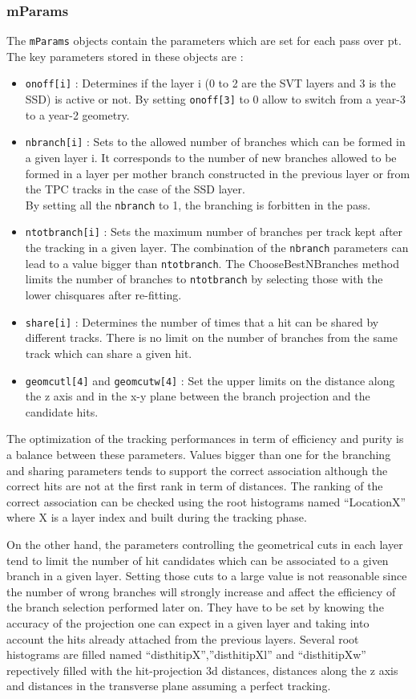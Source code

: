 \documentclass[twoside]{article}
\begin{document}
\subsubsection{mParams}
\label{sec:mParamsq}
The \verb+mParams+ objects contain the parameters which are set for
each pass over pt. The key parameters stored in these objects are :
\begin{itemize}
\item \verb+onoff[i]+ : Determines if the layer i (0 to 2 are the SVT 
layers and 3 is the SSD) is active or not. By setting \verb+onoff[3]+
to 0 allow to switch from a year-3 to a year-2 geometry.
\item \verb+nbranch[i]+ : Sets to the allowed number of branches which can 
be formed in a given layer i. It corresponds to the number of new
branches allowed to be formed in a layer per mother branch
constructed in the previous layer or from the TPC tracks in the case
of the SSD layer.\\ By setting all the \verb+nbranch+ to 1, the
branching is forbitten in the pass.
\item \verb+ntotbranch[i]+ : Sets the maximum number of branches 
per track kept after the tracking in a given layer. The combination of
the \verb+nbranch+ parameters can lead to a value bigger than
\verb+ntotbranch+. The ChooseBestNBranches method limits the number of
branches to \verb+ntotbranch+ by selecting those with the lower
chisquares after re-fitting.
\item \verb+share[i]+ : Determines the number of times that a hit can 
be shared by different tracks. There is no limit on the number of
branches from the same track which can share a given hit.
\item \verb+geomcutl[4]+ and \verb+geomcutw[4]+ : Set the upper limits 
on the distance along the z axis and in the x-y plane between the
branch projection and the candidate hits.
\end{itemize}

The optimization of the tracking performances in term of efficiency
and purity is a balance between these parameters. Values bigger than
one for the branching and sharing parameters tends to support the
correct association although the correct hits are not at the first
rank in term of distances. The ranking of the correct association can
be checked using the root histograms named ``LocationX'' where X is a
layer index and built during the tracking phase.

On the other hand, the parameters controlling the geometrical cuts in
each layer tend to limit the number of hit candidates which can be
associated to a given branch in a given layer. Setting those cuts to a
large value is not reasonable since the number of wrong branches will
strongly increase and affect the efficiency of the branch selection
performed later on. They have to be set by knowing the accuracy of the
projection one can expect in a given layer and taking into account the
hits already attached from the previous layers. Several root
histograms are filled named ``disthitipX'',''disthitipXl'' and
``disthitipXw'' repectively filled with the hit-projection 3d
distances, distances along the z axis and distances in the transverse
plane assuming a perfect tracking. 
\end{document}
